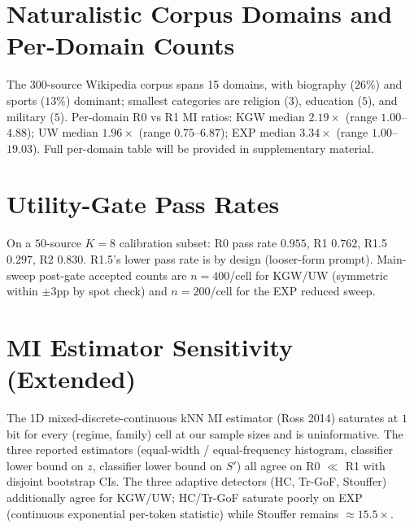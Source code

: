 \documentclass[11pt]{article}
\begin{document}
\section{Naturalistic Corpus Domains and Per-Domain Counts}
\label{app:per_domain}\label{app:natural}
The 300-source Wikipedia corpus spans 15 domains, with biography ($26\%$)
and sports ($13\%$) dominant; smallest categories are religion ($3$),
education ($5$), and military ($5$). Per-domain R0 vs R1 MI ratios:
KGW median $2.19\times$ (range $1.00$--$4.88$); UW median $1.96\times$
(range $0.75$--$6.87$); EXP median $3.34\times$ (range $1.00$--$19.03$).
Full per-domain table will be provided in supplementary material.

\section{Utility-Gate Pass Rates}
\label{app:gate}
On a $50$-source $K{=}8$ calibration subset:
R0 pass rate $0.955$, R1 $0.762$, R1.5 $0.297$, R2 $0.830$.
R1.5's lower pass rate is by design (looser-form prompt). Main-sweep
post-gate accepted counts are $n=400$/cell for KGW/UW (symmetric within
$\pm 3$pp by spot check) and $n=200$/cell for the EXP reduced sweep.

\section{MI Estimator Sensitivity (Extended)}
\label{app:mi_sens}\label{app:bin_sens}
The 1D mixed-discrete-continuous kNN MI estimator (Ross 2014) saturates at
$1$ bit for every (regime, family) cell at our sample sizes and is
uninformative. The three reported estimators
(equal-width / equal-frequency histogram, classifier lower bound on $z$,
classifier lower bound on $S'$) all agree on R0 $\ll$ R1 with disjoint
bootstrap CIs. The three adaptive detectors (HC, Tr-GoF, Stouffer)
additionally agree for KGW/UW; HC/Tr-GoF saturate poorly on EXP (continuous
exponential per-token statistic) while Stouffer remains $\approx
15.5\times$.
\end{document}
